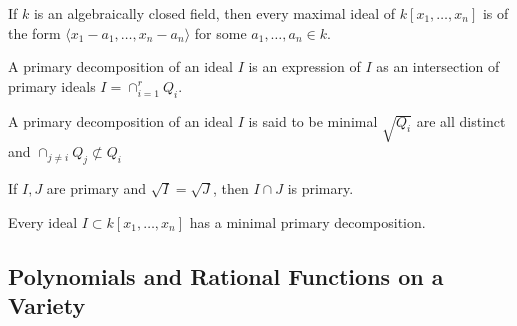 \documentclass[crop=false,class=book,oneside]{standalone}
\begin{document}
                \begin{theorem}
                    If $k$ is an algebraically closed field,
                    then every maximal ideal of $k[x_1,\hdots ,x_n]$
                    is of the form
                    $\langle x_1-a_1,\hdots, x_n-a_n\rangle$
                    for some $a_1,\hdots, a_n\in k$.
                \end{theorem}
                \begin{definition}
                    A primary decomposition of an ideal $I$ is
                    an expression of $I$ as an intersection of
                    primary ideals $I=\cap_{i=1}^{r} Q_{i}$.
                \end{definition}
                \begin{definition}
                    A primary decomposition of an ideal $I$
                    is said to be minimal $\sqrt{Q_i}$ are all
                    distinct and
                    $\cap_{j\ne i}Q_j\not\subset Q_i$
                \end{definition}
                \begin{theorem}
                    If $I,J$ are primary and
                    $\sqrt{I}=\sqrt{J}$,
                    then $I\cap J$ is primary.
                \end{theorem}
                \begin{theorem}
                    Every ideal $I \subset k[x_1,\hdots ,x_n]$
                    has a minimal primary decomposition.
                \end{theorem}
        \subsection{Polynomials and Rational Functions on a Variety}
\end{document}
